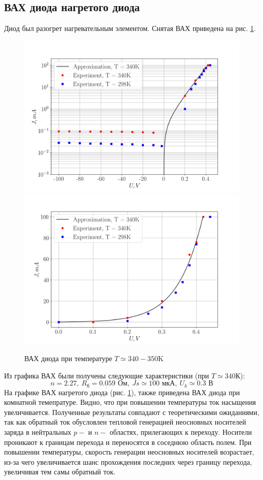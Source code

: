 \subsection{ВАХ диода нагретого диода}
Диод был разогрет нагревательным элементом. Снятая ВАХ приведена на рис. \ref{fig:vaht}.
\begin{figure}[h!]
    \centering
    \includegraphics[width = 0.49\linewidth]{imgs/vah12log.png}
    \includegraphics[width = 0.49\linewidth]{imgs/vah12str.png}
    \caption{ВАХ диода при температуре $T \simeq 340 - 350$K}
    \label{fig:vaht}
\end{figure}

Из графика ВАХ были получены следующие характеристики (при $T\simeq 340$К):
\begin{equation}
    n = 2.27,~ R_{\text{б}} = 0.059 \text{ Ом},~Js \simeq 100 \text{ мкА},~ U_k \simeq 0.3 \text{ В}
\end{equation}
На графике ВАХ нагретого диода (рис. \ref{fig:vaht}), также приведена ВАХ диода при комнатной темепратуре. Видно, что
при повышении температуры ток насыщения увеличивается. Полученные результаты совпадают с теоретическими ожиданиями, так
как обратный ток обусловлен тепловой генерацией неосновных носителей заряда в нейтральных $p-$ и $n-$ областях,
прилегающих к переходу. Носители проникают к границам перехода и переносятся в соседнюю область полем. При повышении
температуры, скорость генерации неосновных носителей возрастает, из-за чего увеличивается шанс прохождения последних
через границу перехода, увеличивая тем самы обратный ток.










